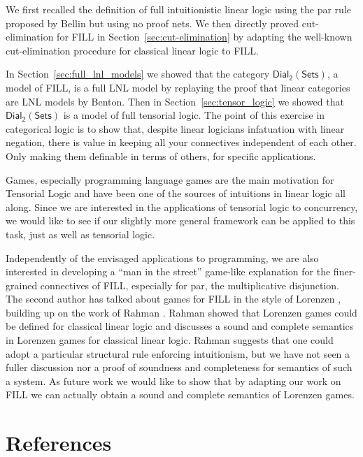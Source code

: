 \documentclass[preprint,12pt]{elsarticle}
\newcommand{\dial}[0]{\mathsf{Dial_2}(\mathsf{Sets})}
\begin{document}
We first recalled the definition of full intuitionistic linear logic using the  par rule proposed by Bellin 
but using
no proof nets.  We then directly proved cut-elimination for FILL in Section~\ref{sec:cut-elimination} by
adapting the well-known cut-elimination procedure for classical linear
logic to FILL.

In Section~\ref{sec:full_lnl_models} we showed that the category
$\dial$, a model of FILL, is a full LNL model by 
replaying the proof that linear
categories are LNL models by Benton. Then in
Section~\ref{sec:tensor_logic} we showed that $\dial$ is a model of full tensorial logic. The point of this exercise in categorical logic
is to show that, despite linear logicians infatuation with linear negation, there is value in keeping all your connectives independent
of each other. Only making them definable in terms of others, for
specific applications.

Games, especially programming language games are the main motivation
for Tensorial Logic and have been one of the sources of intuitions in
linear logic all along. Since we are interested in the applications of
tensorial logic to concurrency, we would like to see if our slightly
more general framework can be applied to this task, just as well as
tensorial logic.

Independently of the envisaged applications to programming, we are
also interested in developing a ``man in the street'' game-like
explanation for the finer-grained connectives of FILL, especially for
par, the multiplicative disjunction. The second author has talked
about games for FILL in the style of Lorenzen \cite{dePaiva:2011},
building up on the work of Rahman
\cite{Keiff:2011,Rahman:2005}. Rahman showed that Lorenzen games could
be defined for classical linear logic \cite{Rahman:2002} and discusses  a sound and complete semantics in Lorenzen games for
classical linear logic. Rahman suggests that one could adopt
a particular structural rule  enforcing intuitionism, but we have not
seen a fuller discussion nor a  proof of soundness and completeness for  semantics of such a system. As future work we would like to show that by adapting our work on FILL  we can actually
obtain a sound and complete semantics of Lorenzen games.


\section*{References}
\label{sec:references}


\end{document}
